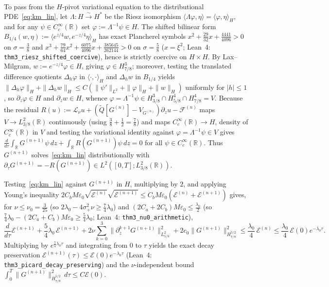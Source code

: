 \documentclass[11pt,a4paper]{article}
\begin{document}
To pass from the $H$-pivot variational equation to the distributional PDE~\eqref{eq:km_lin}, let $\Lambda : H \xrightarrow{\sim} H^*$ be the Riesz isomorphism $\langle \Lambda\varphi, \eta\rangle = \langle \varphi, \eta\rangle_H$, and for any $\psi \in C_c^\infty(\mathbb{R})$ set $\varphi := \Lambda^{-1}\psi \in H$. The shifted bilinear form $B_{1/4}(w, \eta) := \langle e^{z/4}w, e^{-z/4}\eta\rangle_H$ has exact Plancherel symbols $x^2 + \frac{29}{32}x + \frac{4441}{4096} > 0$ on $\sigma = \frac{3}{8}$ and $x^3 + \frac{79}{64}x^2 + \frac{6075}{4096}x + \frac{385645}{262144} > 0$ on $\sigma = \frac{5}{8}$ ($x = \xi^2$; Lean~4: \texttt{thm3\_riesz\_shifted\_coercive}), hence is strictly coercive on $H \times H$. By Lax--Milgram, $w := e^{-z/4}\varphi \in H$, giving $\varphi \in H^3_{7/8}$; moreover, testing the translated difference quotients $\Delta_h\varphi$ in $\langle\cdot,\cdot\rangle_H$ and $\Delta_h w$ in $B_{1/4}$ yields $\|\Delta_h\varphi\|_H + \|\Delta_h w\|_H \le C(\|\psi'\|_{L^2} + \|\varphi\|_H + \|w\|_H)$ uniformly for $|h| \le 1$, so $\partial_z\varphi \in H$ and $\partial_z w \in H$, whence $\varphi = \Lambda^{-1}\psi \in H^3_{3/8}\cap H^4_{5/8}\cap H^4_{7/8} = V$. Because the residual $R(u) := \mathcal{L}_\nu u + (\widetilde{Q}[G^{(n)}]-V_{G^{(n)}})\partial_z u - \mathcal{F}^{(n)}$ maps $V \to L^2_{3/8}(\mathbb{R})$ continuously (using $\frac{3}{8}+\frac{1}{2}=\frac{7}{8}$) and maps $C_c^\infty(\mathbb{R}) \to H$, density of $C_c^\infty(\mathbb{R})$ in $V$ and testing the variational identity against $\varphi = \Lambda^{-1}\psi \in V$ gives $\frac{d}{d\tau}\int_{\mathbb{R}} G^{(n+1)}\psi\,dz + \int_{\mathbb{R}} R(G^{(n+1)})\psi\,dz = 0$ for all $\psi \in C_c^\infty(\mathbb{R})$. Thus $G^{(n+1)}$ solves~\eqref{eq:km_lin} distributionally with $\partial_\tau G^{(n+1)} = -R(G^{(n+1)}) \in L^2([0,T]; L^2_{3/8}(\mathbb{R}))$.

Testing~\eqref{eq:km_lin} against $G^{(n+1)}$ in $H$, multiplying by $2$, and applying Young's inequality $2 C_b M\varepsilon_0\sqrt{\mathcal{E}^{(n)}}\sqrt{\mathcal{E}^{(n+1)}} \le C_b M\varepsilon_0(\mathcal{E}^{(n)} + \mathcal{E}^{(n+1)})$ gives, for $\nu \le \nu_0 = \frac{3}{25}$ (so $2\lambda_0 - 4\sigma_+^2\nu \ge \frac{7}{4}\lambda_0$) and $(2 C_a + 2 C_b)M\varepsilon_0 \le \frac{\lambda_0}{2}$ (so $\frac{7}{4}\lambda_0 - (2C_a+C_b)M\varepsilon_0 \ge \frac{5}{4}\lambda_0$; Lean~4: \texttt{thm3\_nu0\_arithmetic}),
\begin{equation}\label{eq:km_block1}
\frac{d}{d\tau}\mathcal{E}^{(n+1)} + \frac{5}{4}\lambda_0\,\mathcal{E}^{(n+1)} + 2\nu\sum_{k=0}^3\|\partial_z^{k+1}G^{(n+1)}\|_{L^2_{5/8}}^2 + 2 c_0\|G^{(n+1)}\|_{H^{5/2}_{7/8}}^2 \le \frac{\lambda_0}{4}\,\mathcal{E}^{(n)} \le \frac{\lambda_0}{4}\,\mathcal{E}(0)e^{-\lambda_0\tau}.
\end{equation}
Multiplying by $e^{\frac{5}{4}\lambda_0\tau}$ and integrating from $0$ to $\tau$ yields the exact decay preservation $\mathcal{E}^{(n+1)}(\tau) \le \mathcal{E}(0)e^{-\lambda_0\tau}$ (Lean~4: \texttt{thm3\_picard\_decay\_preserving}) and the $\nu$-independent bound $\int_0^T \|G^{(n+1)}\|_{H^{5/2}_{7/8}}^2\,d\tau \le C\mathcal{E}(0)$.
\end{document}
